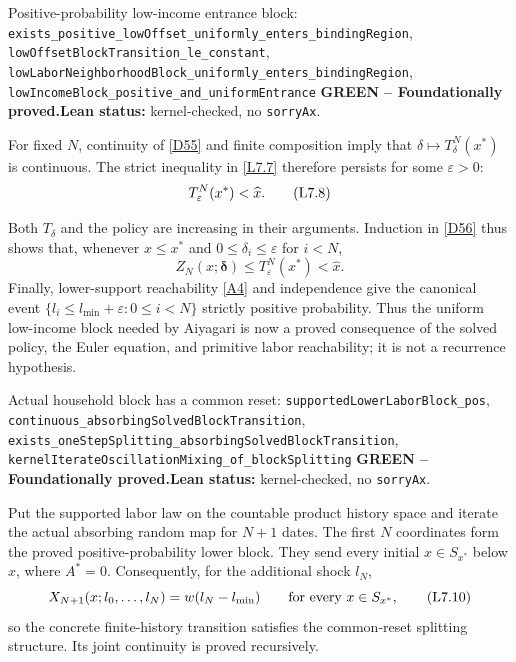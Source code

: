 \documentclass[11pt]{article}
\newcommand{\leanname}[1]{\nolinkurl{#1}}
\newcommand{\eqL}[1]{\refstepcounter{equation}\tag{L#1}}
\newcommand{\formalcheck}{\textbf{Lean status:} kernel-checked, no \texttt{sorryAx}.}
\newcommand{\greenstatus}{\textcolor{proved}{\textbf{GREEN -- Foundationally proved.}}}
\begin{document}
\begin{greenbox}{Positive-probability low-income entrance block:
\leanname{exists_positive_lowOffset_uniformly_enters_bindingRegion},
\leanname{lowOffsetBlockTransition_le_constant},
\leanname{lowLaborNeighborhoodBlock_uniformly_enters_bindingRegion},
\leanname{lowIncomeBlock_positive_and_uniformEntrance}}
\greenstatus\quad\formalcheck

For fixed $N$, continuity of \eqref{D55} and finite composition imply that
$\delta\mapsto T_\delta^N(x^*)$ is continuous.  The strict inequality in
\eqref{L7.7} therefore persists for some $\varepsilon>0$:
\begin{equation}
 T_\varepsilon^N(x^*)<\widehat x.
 \eqL{7.8}\label{L7.8}
\end{equation}
\par\smallskip
Both $T_\delta$ and the policy are increasing in their arguments.  Induction
in \eqref{D56} thus shows that, whenever $x\le x^*$ and
$0\le\delta_i\le\varepsilon$ for $i<N$,
\[
 Z_N(x;\boldsymbol\delta)\le T_\varepsilon^N(x^*)<\widehat x.
\]
Finally, lower-support reachability \eqref{A4} and independence give the
canonical event
\(\{l_i\le l_{\min}+\varepsilon:0\le i<N\}\) strictly positive
probability.  Thus the uniform low-income block needed by Aiyagari is now a
proved consequence of the solved policy, the Euler equation, and primitive
labor reachability; it is not a recurrence hypothesis.
\end{greenbox}

\begin{greenbox}{Actual household block has a common reset:
\leanname{supportedLowerLaborBlock_pos},
\leanname{continuous_absorbingSolvedBlockTransition},
\leanname{exists_oneStepSplitting_absorbingSolvedBlockTransition},
\leanname{kernelIterateOscillationMixing_of_blockSplitting}}
\greenstatus\quad\formalcheck

Put the supported labor law on the countable product history space and iterate
the actual absorbing random map for $N+1$ dates.  The first $N$ coordinates
form the proved positive-probability lower block.  They send every initial
$x\in S_{x^*}$ below $\widehat x$, where $A^*=0$.  Consequently, for the
additional shock $l_N$,
\begin{equation}
 X_{N+1}(x;l_0,\ldots,l_N)
   =w(l_N-l_{\min})\qquad\text{for every }x\in S_{x^*},
 \eqL{7.10}\label{L7.10}
\end{equation}
so the concrete finite-history transition satisfies the common-reset
splitting structure.  Its joint continuity is proved recursively.
\end{greenbox}
\end{document}
